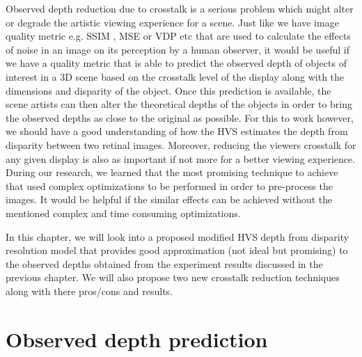 Observed depth reduction due to crosstalk is a serious problem which might alter or degrade the artistic viewing experience for a scene. Just like we have image quality metric e.g. SSIM \cite{wang2004image}, MSE\cite{ wiki:MSE} or VDP\cite{mantiuk2004visible} etc that are used to calculate the effects of noise in an image on its perception by a human observer, it would be useful if we have a quality metric that is able to predict the observed depth of objects of interest in a 3D scene based on the crosstalk level of the display along with the dimensions and disparity of the object. Once this prediction is available, the scene artists can then alter the theoretical depths of the objects in order to bring the observed depths as close to the original as possible. For this to work however, we should have a good understanding of how the HVS estimates the depth from disparity between two retinal images. Moreover, reducing the viewers crosstalk for any given display is also as important if not more for a better viewing experience. During our research, we learned that the most promising technique to achieve that used complex optimizations to be performed in order to pre-process the images\cite{van2011perceptually}. It would be helpful if the similar effects can be achieved without the mentioned complex and time consuming optimizations.

In this chapter, we will look into a proposed modified HVS depth from disparity resolution model that provides good approximation (not ideal but promising) to the observed depths obtained from the experiment results discussed in the previous chapter. We will also propose two new crosstalk reduction techniques along with there pros/cons and results.

\section{Observed depth prediction}

